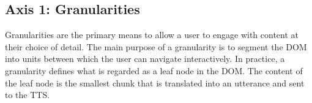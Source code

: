 \documentclass{sig-alternate}
\begin{document}
\subsection{Axis 1: Granularities}
\label{sec:ax1}

Granularities are the primary means to allow a user to engage with content at
their choice of detail. The main purpose of a granularity is to segment the DOM
into units between which the user can navigate interactively.  In practice, a
granularity defines what is regarded as a leaf node in the DOM. The content of
the leaf node is the smallest chunk that is translated into an utterance and
sent to the TTS.

\end{document}

